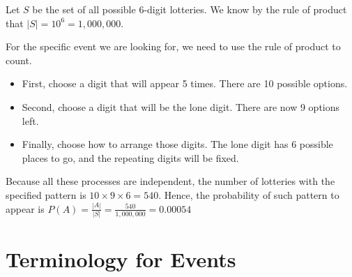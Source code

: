 \begin{frame}
\begin{sol}
Let $S$ be the set of all possible 6-digit lotteries. We know by the rule of product that $|S| = 10^6 = 1,000,000$.

For the specific event we are looking for, we need to use the rule of product to count. 
\begin{itemize}
\item First, choose a digit that will appear 5 times. There are 10 possible options.
\item Second, choose a digit that will be the lone digit. There are now 9 options left.
\item Finally, choose how to arrange those digits. The lone digit has 6 possible places to go, and the repeating digits will be fixed.
\end{itemize}
Because all these processes are independent, the number of lotteries with the specified pattern is $10 \times 9 \times 6 = 540$. Hence, the probability of such pattern to appear is $P(A) = \frac{|A|}{|S|} = \frac{540}{1,000,000} = 0.00054$
\end{sol}
\end{frame}

\section[Event]{Terminology for Events}
\frame{\sectionpage}

